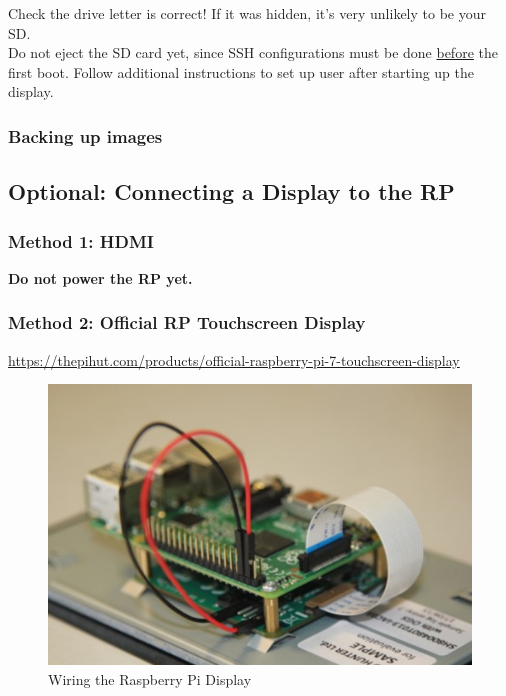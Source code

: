 \documentclass[a4paper, 10pt]{article}
\begin{document}
        Check the drive letter is correct!
        If it was hidden, it’s very unlikely to be your SD. \\
        
        Do not eject the SD card yet, since SSH configurations must be done \underline{before} the first boot.
        Follow additional instructions to set up user after starting up the display. \\
        
    
    \subsubsection{Backing up images}

    \subsection{\textbf{Optional:} Connecting a Display to the RP}
            \subsubsection{\textbf{Method 1: HDMI}}

            \textbf{Do not power the RP yet.} \\
                
            \subsubsection{\textbf{Method 2: Official RP Touchscreen Display}}                   
            \url{https://thepihut.com/products/official-raspberry-pi-7-touchscreen-display}\\

            \begin{figure}[htbp]
            \centering
            \includegraphics[width=\textwidth]{media/rp_display_wiring.jpg}
            \caption{Wiring the Raspberry Pi Display}
            \label{fig:rp_display_wiring}
            \end{figure}
\end{document}
